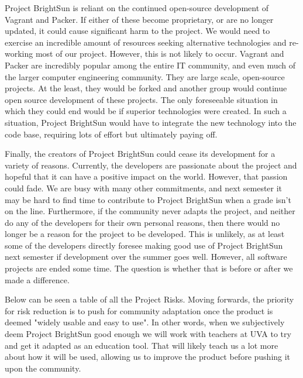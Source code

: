 \documentclass[openright]{report}
\begin{document}
\par Project BrightSun is reliant on the continued open-source development of Vagrant and Packer. If either of these become proprietary, or are no longer updated, it could cause significant harm to the project. We would need to exercise an incredible amount of resources seeking alternative technologies and re-working most of our project. However, this is not likely to occur. Vagrant and Packer are incredibly popular among the entire IT community, and even much of the larger computer engineering community. They are large scale, open-source projects. At the least, they would be forked and another group would continue open source development of these projects. The only foreseeable situation in which they could end would be if superior technologies were created. In such a situation, Project BrightSun would have to integrate the new technology into the code base, requiring lots of effort but ultimately paying off.

\par Finally, the creators of Project BrightSun could cease its development for a variety of reasons. Currently, the developers are passionate about the project and hopeful that it can have a positive impact on the world. However, that passion could fade. We are busy with many other commitments, and next semester it may be hard to find time to contribute to Project BrightSun when a grade isn't on the line. Furthermore, if the community never adapts the project, and neither do any of the developers for their own personal reasons, then there would no longer be a reason for the project to be developed. This is unlikely, as at least some of the developers directly foresee making good use of Project BrightSun next semester if development over the summer goes well. However, all software projects are ended some time. The question is whether that is before or after we made a difference.

\par Below can be seen a table of all the Project Risks. Moving forwards, the priority for risk reduction is to push for community adaptation once the product is deemed "widely usable and easy to use". In other words, when we subjectively deem Project BrightSun good enough we will work with teachers at UVA to try and get it adapted as an education tool. That will likely teach us a lot more about how it will be used, allowing us to improve the product before pushing it upon the community.
\end{document}

